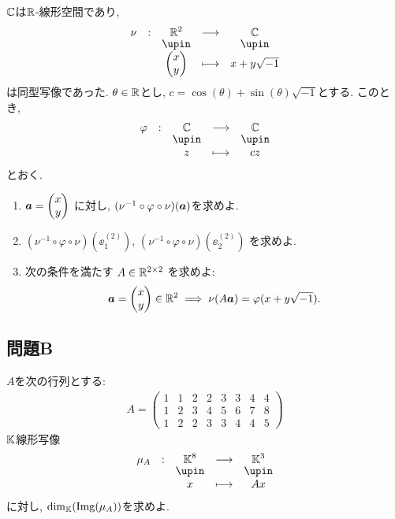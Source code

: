 \begin{quiz}
  $\mathbb{C}$は$\mathbb{R}$-線形空間であり,
  \begin{align*}
    \shazo{\nu}{\RR^2}{\CC}
    {\begin{pmatrix}x\\y\end{pmatrix}}{x+y\sqrt{-1}}
  \end{align*}
  は同型写像であった.
  $\theta\in \mathbb{R}$とし,
  $c=\cos(\theta)+\sin(\theta)\sqrt{-1}$とする.
  このとき, 
  \begin{align*}
    \shazo{\varphi}{\CC}{\CC}
    {z}{cz}
  \end{align*}
  とおく.
  \begin{enumerate}
  \item
    $\boldsymbol{a}=\begin{pmatrix}x\\y\end{pmatrix}$ に対し,
    $(\nu^{-1}\circ\varphi\circ\nu)(\boldsymbol{a})$を求めよ.
  \item
    $(\nu^{-1}\circ\varphi\circ\nu)(\ee^{(2)}_1)$,
    $(\nu^{-1}\circ\varphi\circ\nu)(\ee^{(2)}_2)$
    を求めよ.
  \item
    次の条件を満たす
    $A\in \mathbb{R}^{2\times 2}$
    を求めよ:
    \begin{align*}
      \boldsymbol{a}=\begin{pmatrix}x\\y\end{pmatrix}\in \mathbb{R}^2
      \implies
      \nu(A\boldsymbol{a})=\varphi(x+y\sqrt{-1}).
    \end{align*}
  \end{enumerate}
\end{quiz}


\subsection{問題B}

\begin{quiz}
  $A$を次の行列とする:
  \begin{align*}
    A=
    \begin{pmatrix}
      1&1&2&2&3&3&4&4\\
      1&2&3&4&5&6&7&8\\
      1&2&2&3&3&4&4&5
    \end{pmatrix}
  \end{align*}
  $\mathbb{K}$線形写像
  \begin{align*}
    \shazo{\mu_A}{\KK^8}{\KK^3}
    {x}{Ax}
  \end{align*}
  に対し, $\dim_{\mathbb{K}}(\operatorname{Img}(\mu_A))$を求めよ.
\end{quiz}

